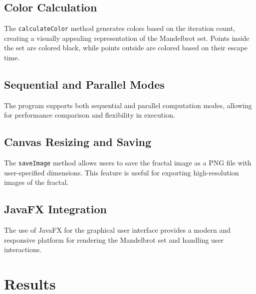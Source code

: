 \documentclass[sigconf]{acmart}
\begin{document}
\subsection{Color Calculation}
The \texttt{calculateColor} method generates colors based on the iteration count, creating a visually appealing representation of the Mandelbrot set. Points inside the set are colored black, while points outside are colored based on their escape time.

\subsection{Sequential and Parallel Modes}
The program supports both sequential and parallel computation modes, allowing for performance comparison and flexibility in execution.

\subsection{Canvas Resizing and Saving}
The \texttt{saveImage} method allows users to save the fractal image as a PNG file with user-specified dimensions. This feature is useful for exporting high-resolution images of the fractal.

\subsection{JavaFX Integration}
The use of JavaFX for the graphical user interface provides a modern and responsive platform for rendering the Mandelbrot set and handling user interactions.

\section{Results}
\end{document}
